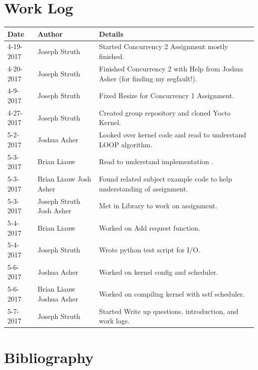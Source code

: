 \documentclass[10pt,draftclsnofoot,onecolumn, compsoc]{IEEEtran}
\begin{document}
\section{Work Log}

\begin{tabular}{| l | l | p{15cm} |}\textbf{Date} & \textbf{Author} & \textbf{Details}\\\hline
4-19-2017 & Joseph Struth & Started Concurrency 2 Assignment mostly finished.\\\hline
4-20-2017 & Joseph Struth & Finished Concurrency 2 with Help from Joshua Asher (for finding my segfault!).\\\hline
4-9-2017 & Joseph Struth & Fixed Resize for Concurrency 1 Assignment.\\\hline
4-27-2017 & Joseph Struth & Created group repository and cloned Yocto Kernel.\\\hline
5-2-2017 & Joshua Asher & Looked over kernel code and read to understand LOOP algorithm.\\\hline
5-3-2017 & Brian Liauw & Read to understand implementation .\\\hline
5-3-2017 & Brian Liauw Josh Asher & Found related subject example code to help understanding of assignment.\\\hline
5-3-2017 & Joseph Struth Josh Asher & Met in Library to work on assignment.\\\hline
5-4-2017 & Brian Liauw & Worked on Add request function.\\\hline
5-4-2017 & Joseph Struth & Wrote python test script for I/O.\\\hline
5-6-2017 & Joshua Asher & Worked on kernel config and scheduler.\\\hline
5-6-2017 & Brian Liauw Joshua Asher & Worked on compiling kernel with sstf scheduler.\\\hline
5-7-2017 & Joseph Struth & Started Write up questions, introduction, and work logs.\\\hline

\end{tabular}

\section{Bibliography}
\nocite{*}


\end{document}
